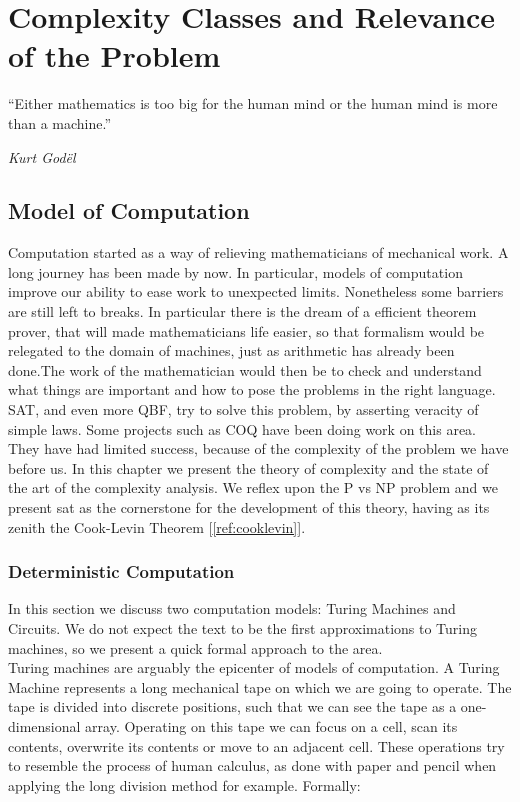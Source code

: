 
\chapter{Complexity Classes and Relevance of the Problem}
\epigraph{“Either mathematics is too big for the human mind or the human mind is more than a machine.” }{\textit{Kurt Godël\cite{goldblatt2014topoi}}}
\section{Model of Computation}


Computation started as a way of relieving mathematicians of mechanical work. A long journey has been made by now. In particular, models of computation improve our ability to ease work to unexpected limits. Nonetheless some barriers are still left to breaks. In particular there is the dream of a efficient theorem prover, that will made mathematicians life easier, so that formalism would be relegated to the domain of machines, just as arithmetic has already been done.The work of the mathematician would then be to check and understand what things are important and how to pose the problems in the right language.\\

SAT, and even more QBF, try to solve this problem, by asserting veracity of simple laws. Some projects such as COQ\cite{bertot2008short} have been doing work on this area. They have had limited success, because of the complexity of the problem  we have before us. In this chapter we present the theory of complexity and the state of the art of the complexity analysis. We reflex upon the P vs NP problem and we present sat as the cornerstone for the development of this theory, having as its zenith the Cook-Levin Theorem [\ref{ref:cooklevin}].

\subsection{Deterministic Computation}
In this section we discuss two computation models: Turing Machines and Circuits. We do not expect the text to be the first approximations to Turing machines, so we present a quick formal approach to the area.  \\

Turing machines are arguably the epicenter of  models of computation. A Turing Machine  represents a long mechanical tape on which we are going to operate. The tape is divided into discrete positions, such that we can see the tape as a one-dimensional array. Operating on this tape we can focus on a cell, scan its contents, overwrite  its contents or move to an adjacent cell. These operations try to resemble the process of human calculus, as done with paper and pencil when applying the long division method  for example. Formally:

